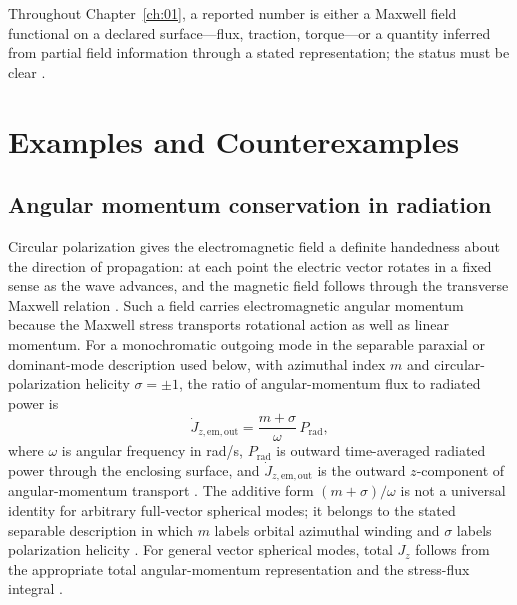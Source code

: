 \label{prop:ch1.observable-inference-criterion}
Throughout Chapter~\ref{ch:01}, a reported number is either a Maxwell field functional on a declared surface---flux, traction, torque---or a quantity inferred from partial field information through a stated representation; the status must be clear \cite{stratton1941}.

\section{Examples and Counterexamples}
\label{sec:ch01.6}

\subsection{Angular momentum conservation in radiation}
\label{sec:ch01.6.1}

Circular polarization gives the electromagnetic field a definite handedness about the direction of propagation: at each point the electric vector rotates in a fixed sense as the wave advances, and the magnetic field follows through the transverse Maxwell relation \cite{stratton1941}. Such a field carries electromagnetic angular momentum because the Maxwell stress transports rotational action as well as linear momentum. For a monochromatic outgoing mode in the separable paraxial or dominant-mode description used below, with azimuthal index $m$ and circular-polarization helicity $\sigma=\pm 1$, the ratio of angular-momentum flux to radiated power is
\begin{equation}
\label{eq:ch1.ex61-helicity-transport-law}
\dot J_{z,\mathrm{em,out}}=\frac{m+\sigma}{\omega}\,P_{\mathrm{rad}},
\end{equation}
where $\omega$ is angular frequency in rad/s, $P_{\mathrm{rad}}$ is outward time-averaged radiated power through the enclosing surface, and $\dot J_{z,\mathrm{em,out}}$ is the outward $z$-component of angular-momentum transport \cite{stratton1941,beth1936}. The additive form $(m+\sigma)/\omega$ is not a universal identity for arbitrary full-vector spherical modes; it belongs to the stated separable description in which $m$ labels orbital azimuthal winding and $\sigma$ labels polarization helicity \cite{stratton1941}. For general vector spherical modes, total $J_z$ follows from the appropriate total angular-momentum representation and the stress-flux integral \cite{stratton1941}.

